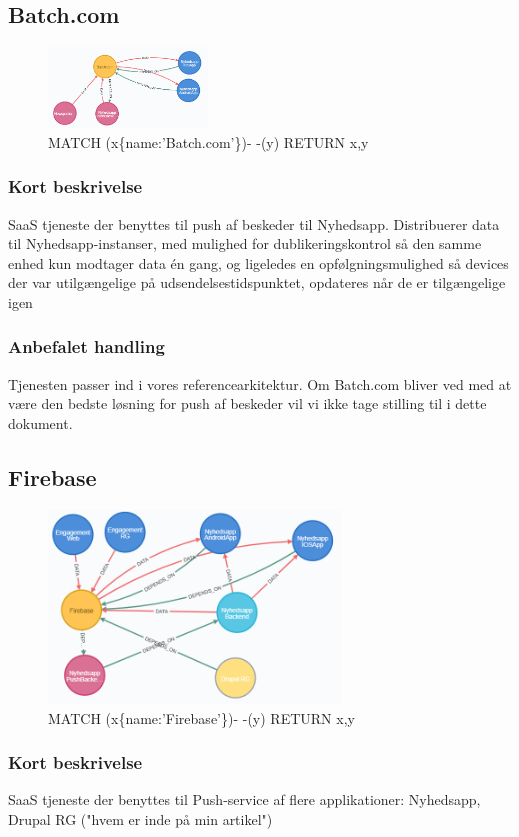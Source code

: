 \documentclass{article}
\begin{document}
\subsection{Batch.com}
\begin{figure}[h]
\includegraphics[width=120pt]{Batch-com.PNG}
\caption{MATCH (x\{name:'Batch.com'\})- -(y) RETURN x,y}
\end{figure}
\subsubsection{Kort beskrivelse}
SaaS tjeneste der benyttes til push af beskeder til Nyhedsapp.
Distribuerer data til Nyhedsapp-instanser, med mulighed for dublikeringskontrol så den samme enhed kun modtager data én gang, og ligeledes en opfølgningsmulighed så devices der var utilgængelige på udsendelsestidspunktet, opdateres når de er tilgængelige igen
\subsubsection{Anbefalet handling}
Tjenesten passer ind i vores referencearkitektur. Om Batch.com bliver ved med at være den bedste løsning for push af beskeder vil vi ikke tage stilling til i dette dokument.


\subsection{Firebase}
\begin{figure}[h]
\includegraphics[width=220pt]{Firebase.PNG}
\caption{MATCH (x\{name:'Firebase'\})- -(y) RETURN x,y}
\end{figure}
\subsubsection{Kort beskrivelse}
SaaS tjeneste der benyttes til Push-service af flere applikationer:
Nyhedsapp, Drupal RG ("hvem er inde på min artikel")
\end{document}
